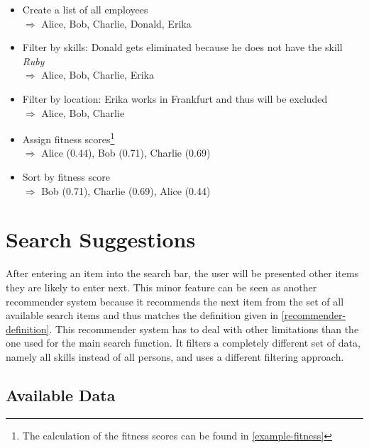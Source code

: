 \begin{itemize}
  \item Create a list of all employees\\
    $\Rightarrow$ Alice, Bob, Charlie, Donald, Erika
  \item Filter by skills: Donald gets eliminated because he does not have the skill \textit{Ruby}\\
    $\Rightarrow$ Alice, Bob, Charlie, Erika
  \item Filter by location: Erika works in Frankfurt and thus will be excluded\\
    $\Rightarrow$ Alice, Bob, Charlie
  \item Assign fitness scores\footnote{The calculation of the fitness scores can be found in \ref{example-fitness}}\\
    $\Rightarrow$ Alice (0.44), Bob (0.71), Charlie (0.69)
  \item Sort by fitness score\\
    $\Rightarrow$ Bob (0.71), Charlie (0.69), Alice (0.44)
\end{itemize}


\newpage
\section{Search Suggestions}
\label{autocomplete}
After entering an item into the search bar, the user will be presented other items they are likely to enter next. This minor feature can be seen as another
recommender system because it recommends the next item from the set of all available search items and thus matches the definition given in \ref{recommender-definition}. This recommender system has to deal with other limitations than the one used for the main search function. It filters a completely different set of data, namely all skills instead of all persons, and uses a different filtering approach.

\subsection{Available Data}
